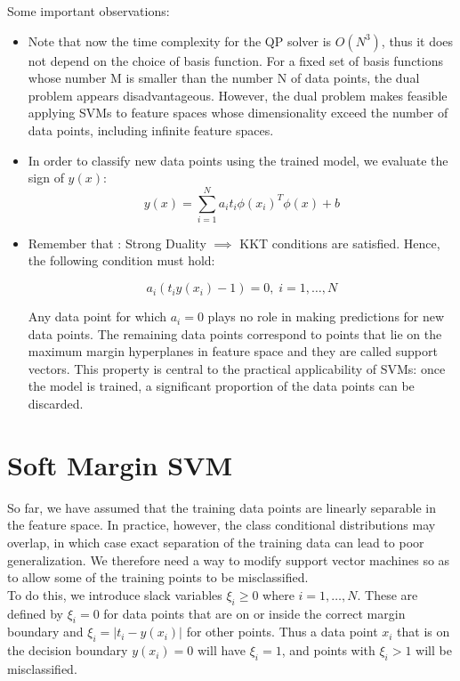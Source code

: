\documentclass[twoside]{article}
\begin{document}
Some important observations:
\begin{itemize}
    \item Note that now the time complexity for the QP solver is $O(N^3)$, thus it does not depend on the choice of basis function. For a fixed set of basis functions whose number M is smaller than the number N of data points, the dual problem appears disadvantageous. However, the dual problem makes feasible applying SVMs to feature spaces whose dimensionality exceed the number of data points, including infinite feature spaces. 
    \item In order to classify new data points using the trained model, we evaluate the sign of $y(x)$: 
    \begin{equation*}
        y(x) = \sum_{i=1}^{N}  a_{i}t_{i} \phi(x_i)^T \phi(x) +b
    \end{equation*}
    \item Remember that : Strong Duality  $\implies$ KKT conditions are satisfied. Hence, the following condition must hold:
    
    \begin{equation*}
         a_{i}(t_{i}y(x_{i})-1) = 0, \; i = 1, \ldots, N
    \end{equation*}
    
    Any data point for which $a_{i} = 0$ plays no role in making predictions for new data points. The remaining data points correspond to points that lie on the maximum margin hyperplanes in feature space and they are called support vectors. This property is central to the practical applicability of SVMs: once the model is trained, a significant proportion of the data points can be discarded.
    
\end{itemize}


\section{Soft Margin SVM} 
So far, we have assumed that the training data points are linearly separable in the feature space. In practice, however, the class conditional distributions may overlap, in which case exact separation of the training data can lead to poor generalization. We therefore need a way to modify support vector machines so as to allow some of the training points to be misclassified. \\

To do this, we introduce slack variables $\xi_{i} \geq 0$ where $i=1,\ldots,N$. These are defined by $\xi_{i} = 0$ for data points that are on or inside the correct margin boundary and $\xi_{i}= \lvert t_{i} - y(x_{i}) \rvert$ for other points. Thus a data point $x_{i}$ that is on the decision boundary $y(x_{i})=0$ will have $\xi_{i} = 1$, and points with $\xi_{i} > 1$ will be misclassified. \\
\end{document}
